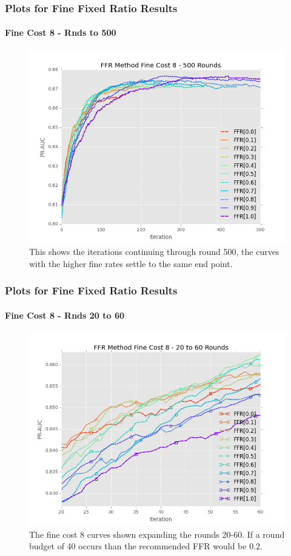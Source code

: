 \documentclass{beamer}
\begin{document}
\begin{frame}
    \frametitle{Plots for Fine Fixed Ratio Results}
    \framesubtitle{Fine Cost 8 - Rnds to 500}
    \begin{figure}[!htb]
        \centering
        \includegraphics[width=0.8\columnwidth]{fig/ParamsFFR_PR_Cost8_rnds0_500}
        \caption{This shows the iterations continuing through round 500, the curves
        with the higher fine rates settle to the same end point.}
        \label{fig:ParamsFFR_PR_Cost8_rnds0_500}
    \end{figure}
\end{frame}
\begin{frame}
    \frametitle{Plots for Fine Fixed Ratio Results}
    \framesubtitle{Fine Cost 8 - Rnds 20 to 60}
    \begin{figure}[!htb]
        \centering
        \includegraphics[width=0.8\columnwidth]{fig/ParamsFFR_PR_Cost8_rnds20_60}
        \caption{The fine cost 8 curves shown expanding the rounds 20-60. If a round budget of 40
        occurs than the recommended FFR would be $0.2$.}
        \label{fig:ParamsFFR_PR_Cost8_rnds20_60}
    \end{figure}
\end{frame}
\end{document}
